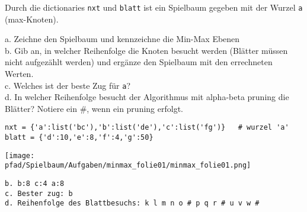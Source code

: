 \question[6]
Durch die dictionaries \texttt{nxt} und \texttt{blatt} ist ein Spielbaum
 gegeben mit der Wurzel \texttt{a} (max-Knoten).

a. Zeichne den Spielbaum und kennzeichne die Min-Max Ebenen \\
b. Gib an, in welcher Reihenfolge die Knoten besucht werden (Blätter müssen nicht aufgezählt werden)
 und ergänze den Spielbaum mit den errechneten Werten. \\
c. Welches ist der beste Zug für \texttt{a}? \\
d. In welcher Reihenfolge besucht der Algorithmus mit alpha-beta pruning die Blätter? Notiere ein \#, wenn
ein pruning erfolgt.

\begin{lstlisting}
nxt = {'a':list('bc'),'b':list('de'),'c':list('fg')}   # wurzel 'a'
blatt = {'d':10,'e':8,'f':4,'g':50}
\end{lstlisting}
\begin{solutionbox}{10cm}
\texttt{[image: \\pfad/Spielbaum/Aufgaben/minmax\_folie01/minmax\_folie01.png]}
\begin{lstlisting}
b. b:8 c:4 a:8
c. Bester zug: b
d. Reihenfolge des Blattbesuchs: k l m n o # p q r # u v w #
\end{lstlisting}
\end{solutionbox}
